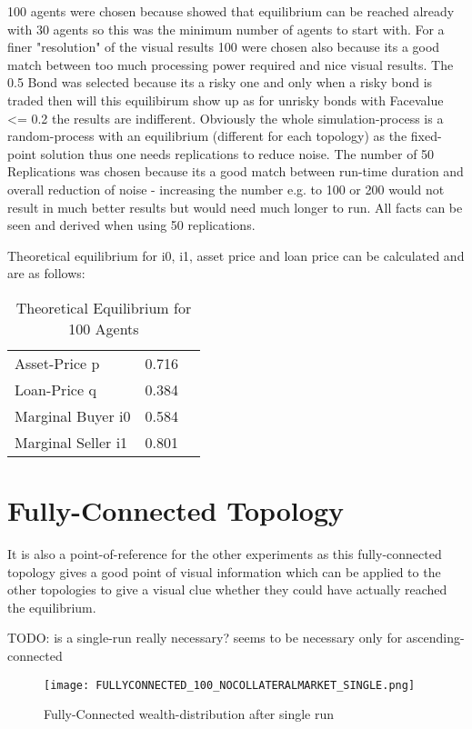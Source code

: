 \documentclass[Bachelorarbeit.tex]{subfiles}
\begin{document}
100 agents were chosen because \cite{Breuer2015} showed that equilibrium can be reached already with 30 agents so this was the minimum number of agents to start with. For a finer "resolution" of the visual results 100 were chosen also because its a good match between too much processing power required and nice visual results.
The 0.5 Bond was selected because its a risky one and only when a risky bond is traded then will this equilibirum show up as for unrisky bonds with Facevalue <= 0.2 the results are indifferent.
Obviously the whole simulation-process is a random-process with an equilibrium (different for each topology) as the fixed-point solution thus one needs replications to reduce noise. The number of 50 Replications was chosen because its a good match between run-time duration and overall reduction of noise - increasing the number e.g. to 100 or 200 would not result in much better results but would need much longer to run. All facts can be seen and derived when using 50 replications.

Theoretical equilibrium for i0, i1, asset price and loan price can be calculated and are as follows:

\begin{table}[h]
	\centering
	\caption{Theoretical Equilibrium for 100 Agents}
	\begin{tabular} { l c r }
		\hline
		Asset-Price p & 0.716 \\
		Loan-Price q & 0.384 \\
		Marginal Buyer i0 & 0.584 \\
		Marginal Seller i1 & 0.801 \\
		\hline
	\end{tabular}
\end{table}





\section{Fully-Connected Topology}


It is also a point-of-reference for the other experiments as this fully-connected topology gives a good point of visual information which can be applied to the other topologies to give a visual clue whether they could have actually reached the equilibrium.

TODO: is a single-run really necessary? seems to be necessary only for ascending-connected 

\begin{figure}[!htbp]
	\centering
  \texttt{[image: FULLYCONNECTED\_100\_NOCOLLATERALMARKET\_SINGLE.png]}
	\caption{Fully-Connected wealth-distribution after single run}
	\label{fig1}
\end{figure}
\end{document}
